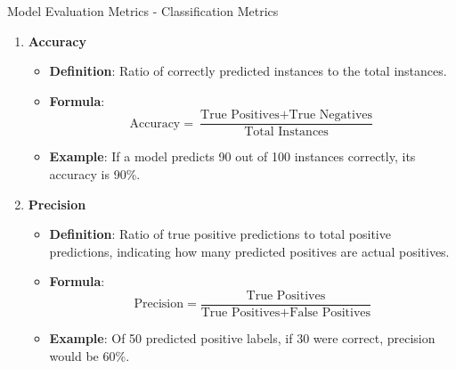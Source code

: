 \documentclass[aspectratio=169]{beamer}
\begin{document}
\begin{frame}[fragile]{Model Evaluation Metrics - Classification Metrics}
    \begin{enumerate}
        \item \textbf{Accuracy}
        \begin{itemize}
            \item \textbf{Definition}: Ratio of correctly predicted instances to the total instances.
            \item \textbf{Formula}: 
            \begin{equation}
            \text{Accuracy} = \frac{\text{True Positives} + \text{True Negatives}}{\text{Total Instances}}
            \end{equation}
            \item \textbf{Example}: If a model predicts 90 out of 100 instances correctly, its accuracy is 90\%.
        \end{itemize}
        
        \item \textbf{Precision}
        \begin{itemize}
            \item \textbf{Definition}: Ratio of true positive predictions to total positive predictions, indicating how many predicted positives are actual positives.
            \item \textbf{Formula}: 
            \begin{equation}
            \text{Precision} = \frac{\text{True Positives}}{\text{True Positives} + \text{False Positives}}
            \end{equation}
            \item \textbf{Example}: Of 50 predicted positive labels, if 30 were correct, precision would be 60\%.
        \end{itemize}
    \end{enumerate}
\end{frame}
\end{document}
